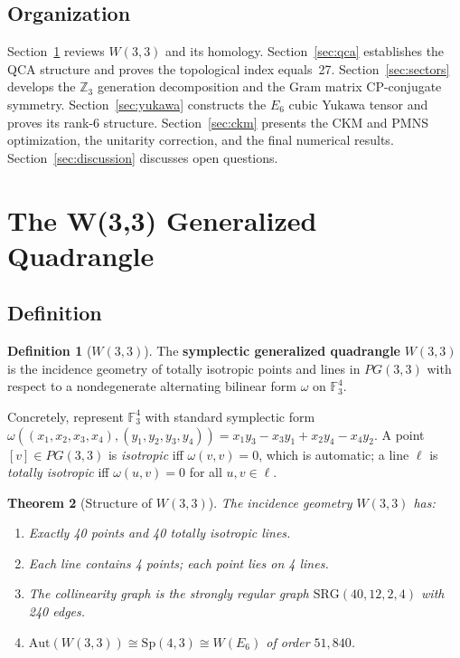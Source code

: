 \documentclass[11pt,a4paper]{article}
\newtheorem{theorem}{Theorem}[section]
\theoremstyle{definition}
\newtheorem{definition}[theorem]{Definition}
\theoremstyle{remark}
\newcommand{\GF}[1]{\mathbb{F}_{#1}}
\newcommand{\ZZ}{\mathbb{Z}}
\newcommand{\Aut}{\mathrm{Aut}}
\newcommand{\Sp}{\mathrm{Sp}}
\begin{document}
\subsection{Organization}

Section~\ref{sec:geometry} reviews $W(3{,}3)$ and its homology.
Section~\ref{sec:qca} establishes the QCA structure and proves the
topological index equals~27.
Section~\ref{sec:sectors} develops the $\ZZ_3$ generation decomposition and the
Gram matrix CP-conjugate symmetry.
Section~\ref{sec:yukawa} constructs the $E_6$ cubic Yukawa tensor and proves its
rank-6 structure.
Section~\ref{sec:ckm} presents the CKM and PMNS optimization, the unitarity
correction, and the final numerical results.
Section~\ref{sec:discussion} discusses open questions.

\section{The W(3,3) Generalized Quadrangle}\label{sec:geometry}

\subsection{Definition}

\begin{definition}[$W(3{,}3)$]
The \textbf{symplectic generalized quadrangle} $W(3{,}3)$ is the incidence
geometry of totally isotropic points and lines in $PG(3,3)$ with respect
to a nondegenerate alternating bilinear form $\omega$ on $\GF{3}^4$.
\end{definition}

Concretely, represent $\GF{3}^4$ with standard symplectic form
$\omega((x_1,x_2,x_3,x_4),(y_1,y_2,y_3,y_4)) = x_1 y_3 - x_3 y_1 + x_2 y_4 - x_4 y_2$.
A point $[v] \in PG(3,3)$ is \emph{isotropic} iff $\omega(v,v)=0$, which is
automatic; a line $\ell$ is \emph{totally isotropic} iff $\omega(u,v)=0$ for all
$u,v \in \ell$.

\begin{theorem}[Structure of $W(3{,}3)$]\label{thm:structure}
The incidence geometry $W(3{,}3)$ has:
\begin{enumerate}[label=(\roman*),nosep]
  \item Exactly 40 points and 40 totally isotropic lines.
  \item Each line contains 4 points; each point lies on 4 lines.
  \item The collinearity graph is the strongly regular graph $\mathrm{SRG}(40,12,2,4)$
    with 240 edges.
  \item $\Aut(W(3{,}3)) \cong \Sp(4,3) \cong W(E_6)$ of order $51{,}840$.
\end{enumerate}
\end{theorem}
\end{document}
